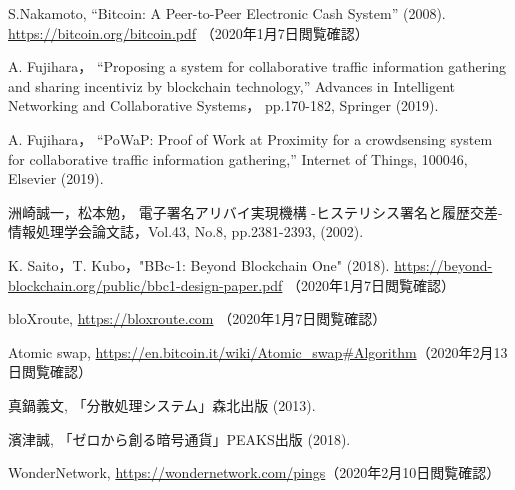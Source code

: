 \documentclass[a4paper,12pt]{jsarticle}
\begin{document}
\newpage

\begin{thebibliography}{99}
S.Nakamoto,
``Bitcoin: A Peer-to-Peer Electronic Cash System'' (2008).
\url {https://bitcoin.org/bitcoin.pdf} （2020年1月7日閲覧確認）

A. Fujihara，
``Proposing a system for collaborative traffic information gathering 
and sharing incentiviz by blockchain technology,''
Advances in Intelligent Networking and Collaborative Systems，
pp.170-182, Springer (2019).

A. Fujihara，
``PoWaP: Proof of Work at Proximity for a crowdsensing system for 
collaborative traffic information gathering,'' 
Internet of Things, 100046, Elsevier (2019).

洲崎誠一，松本勉，
電子署名アリバイ実現機構 -ヒステリシス署名と履歴交差-
情報処理学会論文誌，Vol.43, No.8, pp.2381-2393, (2002).

K. Saito，T. Kubo，"BBc-1: Beyond Blockchain One" (2018).
\url{https://beyond-blockchain.org/public/bbc1-design-paper.pdf} （2020年1月7日閲覧確認）

bloXroute, \url{https://bloxroute.com} （2020年1月7日閲覧確認）

Atomic swap, \url{https://en.bitcoin.it/wiki/Atomic_swap#Algorithm}（2020年2月13日閲覧確認）

真鍋義文, 「分散処理システム」森北出版 (2013).

濱津誠, 「ゼロから創る暗号通貨」PEAKS出版 (2018).

WonderNetwork, \url{https://wondernetwork.com/pings}（2020年2月10日閲覧確認）


\end{thebibliography} 
\end{document}
